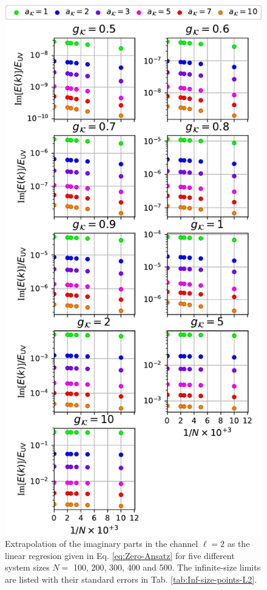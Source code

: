 \documentclass[english,aps,prd,nofootinbib,twocolumn]{revtex4-1}
\begin{document}
\begin{figure}
\centering 
\includegraphics[scale=0.6]{./PlotReport/PlotsSizesL2}
\caption{Extrapolation of the imaginary parts in the channel $\ell=2$ as the linear regresion given in Eq. \eqref{eq:Zero-Ansatz} for five different system sizes $N=$ 100, 200, 300, 400 and 500. The infinite-size limits are listed with their standard errors in Tab. \ref{tab:Inf-size-points-L2}. }
\end{figure}
\end{document}
